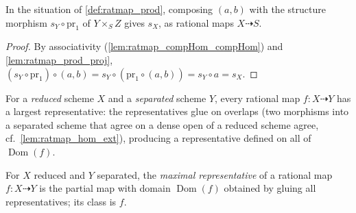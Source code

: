 \begin{lemma}
  \label{lem:ratmap_prod_over}
  \leanok
  In the situation of \ref{def:ratmap_prod}, composing \((a,b)\) with the
  structure morphism \(s_Y \circ \mathrm{pr}_1\) of \(Y \times_S Z\) gives
  \(s_X\), as rational maps \(X \dashrightarrow S\).
\end{lemma}
\begin{proof}
  \leanok
  By associativity (\ref{lem:ratmap_compHom_compHom}) and
  \ref{lem:ratmap_prod_proj},
  \((s_Y \circ \mathrm{pr}_1) \circ (a,b) = s_Y \circ (\mathrm{pr}_1 \circ (a,b))
  = s_Y \circ a = s_X\).
\end{proof}

For a \emph{reduced} scheme \(X\) and a \emph{separated} scheme \(Y\), every
rational map \(f : X \dashrightarrow Y\) has a largest representative: the
representatives glue on overlaps (two morphisms into a separated scheme that
agree on a dense open of a reduced scheme agree, cf.\
\ref{lem:ratmap_hom_ext}), producing a representative defined on all of
\(\operatorname{Dom}(f)\).

\begin{definition}
  \label{def:ratmap_toPartialMap}
  \mathlibok
  \leanok
  For \(X\) reduced and \(Y\) separated, the \emph{maximal representative} of a
  rational map \(f : X \dashrightarrow Y\) is the partial map with domain
  \(\operatorname{Dom}(f)\) obtained by gluing all representatives; its class
  is \(f\).
\end{definition}

